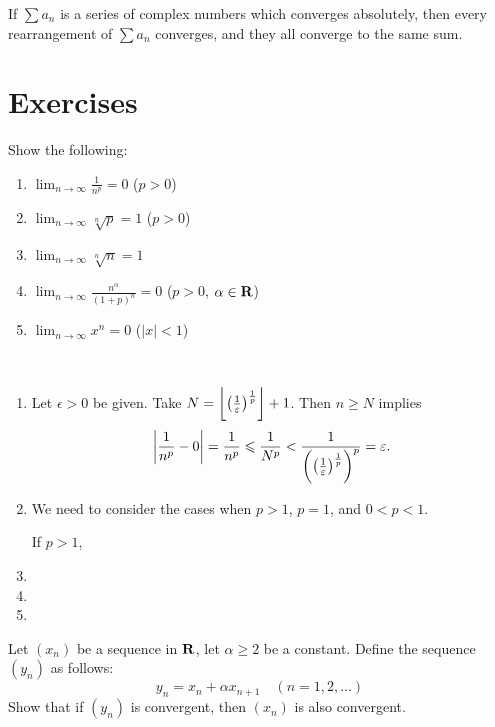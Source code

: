 \begin{proposition}
If $\sum a_n$ is a series of complex numbers which converges absolutely, then every rearrangement of $\sum a_n$ converges, and they all converge to the same sum.
\end{proposition}
\pagebreak

\section*{Exercises}
\begin{prbm}
Show the following:
\begin{enumerate}[label=(\roman*)]
\item $\displaystyle\lim_{n\to\infty}\frac{1}{n^p}=0$ ($p>0$)
\item $\displaystyle\lim_{n\to\infty}\sqrt[n]{p}=1$ ($p>0$)
\item $\displaystyle\lim_{n\to\infty}\sqrt[n]{n}=1$
\item $\displaystyle\lim_{n\to\infty}\frac{n^\alpha}{(1+p)^n}=0$ ($p>0$, $\alpha\in\mathbf R$)
\item $\displaystyle\lim_{n\to\infty}x^n=0$ ($|x|<1$)
\end{enumerate}
\end{prbm}

\begin{solution} \
\begin{enumerate}[label=(\roman*)]
\item Let $\epsilon>0$ be given. Take $N=\left\lfloor \left(\frac{1}{\varepsilon}\right)^\frac{1}{p} \right\rfloor+1$. Then $n\ge N$ implies
\[\left|\frac{1}{n^p}-0\right|=\frac{1}{n^p}\leqslant\frac{1}{N^p}<\frac{1}{\left(\left(\frac{1}{\varepsilon}\right)^\frac{1}{p}\right)^p}=\varepsilon.\]
\item We need to consider the cases when $p>1$, $p=1$, and $0<p<1$.

If $p>1$, 

\item 
\item 
\item 
\end{enumerate}
\end{solution}

\begin{prbm}
Let $(x_n)$ be a sequence in $\mathbf R$, let $\alpha\ge2$ be a constant. Define the sequence $(y_n)$ as follows:
\[y_n=x_n+\alpha x_{n+1}\quad(n=1,2,\dots)\]
Show that if $(y_n)$ is convergent, then $(x_n)$ is also convergent.
\end{prbm}

